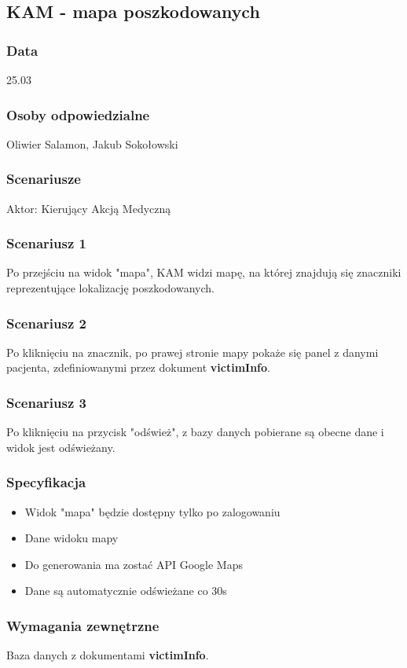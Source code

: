 \subsection{KAM - mapa poszkodowanych}
\subsubsection{Data}
25.03
\subsubsection{Osoby odpowiedzialne}
Oliwier Salamon, Jakub Sokołowski
\subsubsection{Scenariusze}
Aktor: Kierujący Akcją Medyczną
\subsubsection{Scenariusz 1}
Po przejściu na widok "mapa", KAM widzi mapę, na której znajdują się znaczniki reprezentujące lokalizację poszkodowanych.
\subsubsection{Scenariusz 2}
Po kliknięciu na znacznik, po prawej stronie mapy pokaże się panel z danymi pacjenta, zdefiniowanymi przez dokument \textbf{victimInfo}.
\subsubsection{Scenariusz 3}
Po kliknięciu na przycisk "odśwież", z bazy danych pobierane są obecne dane i widok jest odświeżany.
\subsubsection{Specyfikacja}
\begin{itemize}
    \item{Widok "mapa" będzie dostępny tylko po zalogowaniu}
    \item{Dane widoku mapy}
    \item{Do generowania ma zostać API Google Maps}
    \item{Dane są automatycznie odświeżane co 30s}
\end{itemize}
\subsubsection{Wymagania zewnętrzne}
Baza danych z dokumentami \textbf{victimInfo}.
